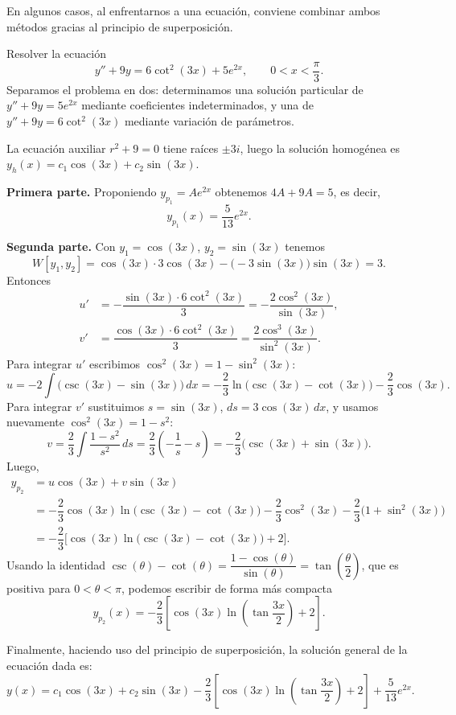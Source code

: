 En algunos casos, al enfrentarnos a una ecuaci\'on, conviene combinar ambos m\'etodos gracias al principio de superposici\'on.

\begin{example}
    Resolver la ecuaci\'on
    \[
    y''+9y=6\cot^2(3x)+5e^{2x},\qquad 0<x<\dfrac{\pi}{3}.
    \]
    Separamos el problema en dos: determinamos una soluci\'on particular de $y''+9y=5e^{2x}$ mediante coeficientes indeterminados, y una de $y''+9y=6\cot^2(3x)$ mediante variaci\'on de par\'ametros.

    La ecuaci\'on auxiliar $r^2+9=0$ tiene ra\'ices $\pm3i$, luego la soluci\'on homog\'enea es $y_h(x)=c_1\cos(3x)+c_2\sin(3x)$.

    \textbf{Primera parte.} Proponiendo $y_{p_1}=Ae^{2x}$ obtenemos $4A+9A=5$, es decir,
    \[
    y_{p_1}(x)=\dfrac{5}{13}e^{2x}.
    \]

    \textbf{Segunda parte.} Con $y_1=\cos(3x)$, $y_2=\sin(3x)$ tenemos
    \[
    W[y_1,y_2]=\cos(3x)\cdot3\cos(3x)-\big(-3\sin(3x)\big)\sin(3x)=3.
    \]
    Entonces
    \begin{align*}
    u'&=-\dfrac{\sin(3x)\cdot6\cot^2(3x)}{3}=-\dfrac{2\cos^2(3x)}{\sin(3x)},\\
    v'&=\dfrac{\cos(3x)\cdot6\cot^2(3x)}{3}=\dfrac{2\cos^3(3x)}{\sin^2(3x)}.
    \end{align*}
    Para integrar $u'$ escribimos $\cos^2(3x)=1-\sin^2(3x)$:
    \[
    u=-2\int\big(\csc(3x)-\sin(3x)\big)\,dx=-\dfrac{2}{3}\ln\big(\csc(3x)-\cot(3x)\big)-\dfrac{2}{3}\cos(3x).
    \]
    Para integrar $v'$ sustituimos $s=\sin(3x)$, $ds=3\cos(3x)\,dx$, y usamos nuevamente $\cos^2(3x)=1-s^2$:
    \[
    v=\dfrac{2}{3}\int\dfrac{1-s^2}{s^2}\,ds=\dfrac{2}{3}\left(-\dfrac{1}{s}-s\right)=-\dfrac{2}{3}\big(\csc(3x)+\sin(3x)\big).
    \]
    Luego,
    \begin{align*}
        y_{p_2}&=u\cos(3x)+v\sin(3x)\\
        &=-\dfrac{2}{3}\cos(3x)\ln\big(\csc(3x)-\cot(3x)\big)-\dfrac{2}{3}\cos^2(3x)-\dfrac{2}{3}\big(1+\sin^2(3x)\big)\\
        &=-\dfrac{2}{3}\Big[\cos(3x)\ln\big(\csc(3x)-\cot(3x)\big)+2\Big].
    \end{align*}
    Usando la identidad $\csc(\theta)-\cot(\theta)=\dfrac{1-\cos(\theta)}{\sin(\theta)}=\tan\left(\dfrac{\theta}{2}\right)$, que es positiva para $0<\theta<\pi$, podemos escribir de forma m\'as compacta
    \[
    y_{p_2}(x)=-\dfrac{2}{3}\left[\cos(3x)\ln\left(\tan\dfrac{3x}{2}\right)+2\right].
    \]

    Finalmente, haciendo uso del principio de superposici\'on, la soluci\'on general de la ecuaci\'on dada es:
    \[
    y(x)=c_1\cos(3x)+c_2\sin(3x)-\dfrac{2}{3}\left[\cos(3x)\ln\left(\tan\dfrac{3x}{2}\right)+2\right]+\dfrac{5}{13}e^{2x}.
    \]
\end{example}

